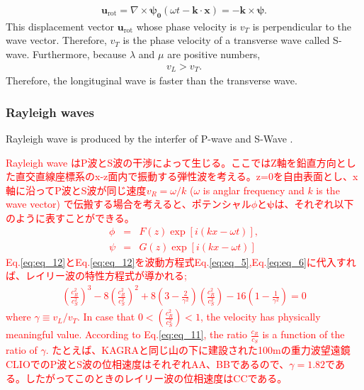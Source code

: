 \begin{eqnarray}
  \bm{u}_{\mathrm{rot}} = \nabla\times{\bm{\psi_{0}}(\omega{t}-\bm{k}\cdot{\bm{x}})} =-\bm{k}\times{\bm{\psi}}.
\end{eqnarray}
This displacement vector $\bm{u}_{\mathrm{rot}}$ whose phase velocity is $v_{T}$ is perpendicular to the wave vector. Therefore, $v_{T}$ is the phase velocity of a transverse wave called S-wave. Furthermore, because  $\lambda$ and $\mu$ are positive numbers, 
\begin{eqnarray}
  v_{L} > v_{T}.\label{eq:eq_10}
\end{eqnarray}
Therefore, the longituginal wave is faster than the transverse wave.



\subsubsection{Rayleigh waves}
Rayleigh wave is produced by the interfer of P-wave and S-Wave \cite{hasegawa2015jishin}. 

\textcolor{red}{
  Rayleigh wave はP波とS波の干渉によって生じる\cite{hasegawa2015jishin}。ここではZ軸を鉛直方向とした直交直線座標系のx-z面内で振動する弾性波を考える。z=0を自由表面とし、x軸に沿ってP波とS波が同じ速度$v_{R}=\omega/k$ ($\omega$ is anglar frequency and $k$ is the wave vector) で伝搬する場合を考えると、ポテンシャル$\phi$と$\bm{\psi}$は、それぞれ以下のように表すことができる。
\begin{eqnarray}
  \phi &=& F(z)\exp[i(kx-\omega{t})],\label{eq:eq_12}\\
  \psi &=& G(z)\exp[i(kx-\omega{t})]\label{eq:eq_13}
\end{eqnarray}
Eq.\ref{eq:eq_12}とEq.\ref{eq:eq_12}を波動方程式Eq.\ref{eq:eq_5},Eq.\ref{eq:eq_6}に代入すれば、レイリー波の特性方程式が導かれる;
\begin{eqnarray}\label{eq:eq_11}
\left(\frac{c_{R}^{2}}{c_{S}^{2}}\right)^{3}-8\left(\frac{c_{R}^{2}}{c_{S}^{2}}\right)^{2}+8\left(3-\frac{2}{\gamma^2}\right)\left(\frac{c_{R}^{2}}{c_{S}^{2}}\right)-16\left(1-\frac{1}{\gamma^2}\right)=0
\end{eqnarray}
where $\gamma\equiv v_{L}/v_{T}$. In case that $0 < (\frac{c_{R}^2}{c_{S}^2}) <1$, the velocity has physically meaningful value. According to Eq.\ref{eq:eq_11}, the ratio $\frac{c_R}{c_S}$ is a function of the ratio of $\gamma$. たとえば、KAGRAと同じ山の下に建設された100mの重力波望遠鏡CLIOでのP波とS波の位相速度はそれぞれAA、BBである\cite{takemoto2003}ので、$\gamma = 1.82 $である。したがってこのときのレイリー波の位相速度はCCである。
}



